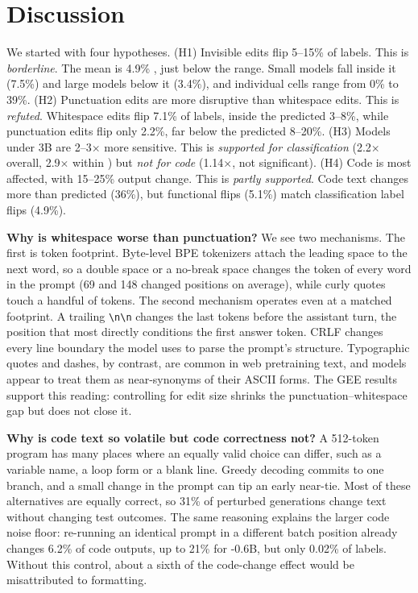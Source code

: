 \section{Discussion}
\label{sec:discussion}

We started with four hypotheses.
(H1) Invisible edits flip 5--15\% of labels. This is \emph{borderline}. The mean is 4.9\% , just below the range. Small models fall inside it (7.5\%) and large models below it (3.4\%), and individual cells range from 0\% to 39\%.
(H2) Punctuation edits are more disruptive than whitespace edits. This is \emph{refuted}. Whitespace edits flip 7.1\% of labels, inside the predicted 3--8\%, while punctuation edits flip only 2.2\%, far below the predicted 8--20\%.
(H3) Models under 3B are 2--3$\times$ more sensitive. This is \emph{supported for classification} (2.2$\times$ overall, 2.9$\times$ within \qwentwo) but \emph{not for code} (1.14$\times$, not significant).
(H4) Code is most affected, with 15--25\% output change. This is \emph{partly supported}. Code text changes more than predicted (36\%), but functional flips (5.1\%) match classification label flips (4.9\%).

{\bf Why is whitespace worse than punctuation?}
We see two mechanisms.
The first is token footprint.
Byte-level BPE tokenizers attach the leading space to the next word, so a double space or a no-break space changes the token of every word in the prompt (69 and 148 changed positions on average), while curly quotes touch a handful of tokens.
The second mechanism operates even at a matched footprint.
A trailing \texttt{\textbackslash n\textbackslash n} changes the last tokens before the assistant turn, the position that most directly conditions the first answer token.
CRLF changes every line boundary the model uses to parse the prompt's structure.
Typographic quotes and dashes, by contrast, are common in web pretraining text, and models appear to treat them as near-synonyms of their ASCII forms.
The GEE results support this reading: controlling for edit size shrinks the punctuation--whitespace gap but does not close it.

{\bf Why is code text so volatile but code correctness not?}
A 512-token program has many places where an equally valid choice can differ, such as a variable name, a loop form or a blank line.
Greedy decoding commits to one branch, and a small change in the prompt can tip an early near-tie.
Most of these alternatives are equally correct, so 31\% of perturbed generations change text without changing test outcomes.
The same reasoning explains the larger code noise floor: re-running an identical prompt in a different batch position already changes 6.2\% of code outputs, up to 21\% for \qwenthree-0.6B, but only 0.02\% of labels.
Without this control, about a sixth of the code-change effect would be misattributed to formatting.

